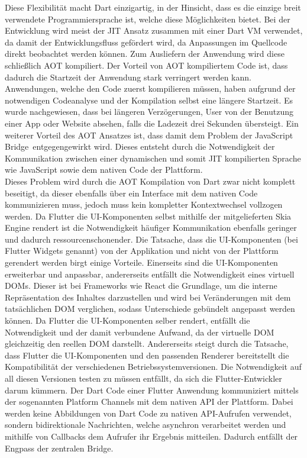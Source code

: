 Diese Flexibilität macht Dart einzigartig, in der Hinsicht, dass es die einzige breit verwendete Programmiersprache ist, welche diese Möglichkeiten bietet. Bei der Entwicklung wird meist der \ac{JIT} Ansatz zusammen mit einer Dart \ac{VM} verwendet, da damit der Entwicklungsfluss gefördert wird, da Anpassungen im Quellcode direkt beobachtet werden können. Zum Ausliefern der Anwendung wird diese schließlich \ac{AOT} kompiliert. Der Vorteil von \ac{AOT} kompiliertem Code ist, dass dadurch die Startzeit der Anwendung stark verringert werden kann. Anwendungen, welche den Code zuerst kompilieren müssen, haben aufgrund der notwendigen Codeanalyse und der Kompilation selbst eine längere Startzeit. Es wurde nachgewiesen, dass bei längeren Verzögerungen, User von der Benutzung einer App oder Website absehen, falls die Ladezeit drei Sekunden übersteigt\cite{akamai_abandonment}. Ein weiterer Vorteil des \ac{AOT} Ansatzes ist, dass damit dem Problem der \glqq JavaScript Bridge\grqq\ entgegengewirkt wird. Dieses entsteht durch die Notwendigkeit der Kommunikation zwischen einer dynamischen und somit \ac{JIT} kompilierten Sprache wie JavaScript sowie dem nativen Code der Plattform.\\

Dieses Problem wird durch die \ac{AOT} Kompilation von Dart zwar nicht komplett beseitigt, da dieser ebenfalls über ein Interface mit dem nativen Code kommunizieren muss, jedoch muss kein kompletter Kontextwechsel vollzogen werden. Da Flutter die \ac{UI}-Komponenten selbst mithilfe der mitgelieferten Skia Engine rendert ist die Notwendigkeit häufiger Kommunikation ebenfalls geringer und dadurch ressourcenschonender.
Die Tatsache, dass die \ac{UI}-Komponenten (bei Flutter Widgets genannt) von der Applikation und nicht von der Plattform gerendert werden birgt einige Vorteile. Einerseits sind die UI-Komponenten erweiterbar und anpassbar, andererseits entfällt die Notwendigkeit eines virtuell \ac{DOM}s. Dieser ist bei Frameworks wie React die Grundlage, um die interne Repräsentation des Inhaltes darzustellen und wird bei Veränderungen mit dem tatsächlichen \ac{DOM} verglichen, sodass Unterschiede gebündelt angepasst werden können. Da Flutter die \ac{UI}-Komponenten selber rendert, entfällt die Notwendigkeit und der damit verbundene Aufwand, da der virtuelle \ac{DOM} gleichzeitig den reellen \ac{DOM} darstellt.
Andererseits steigt durch die Tatsache, dass Flutter die UI-Komponenten und den passenden Renderer bereitstellt die Kompatibilität der verschiedenen Betriebssystemversionen. Die Notwendigkeit auf all diesen Versionen testen zu müssen entfällt, da sich die Flutter-Entwickler darum kümmern.
Der Dart Code einer Flutter Anwendung kommuniziert mittels der sogenannten Platform Channels mit dem nativen API der Plattform. Dabei werden keine Abbildungen von Dart Code zu nativen \ac{API}-Aufrufen verwendet, sondern bidirektionale Nachrichten, welche asynchron verarbeitet werden und mithilfe von Callbacks dem Aufrufer ihr Ergebnis mitteilen. Dadurch entfällt der Engpass der zentralen Bridge.\\

